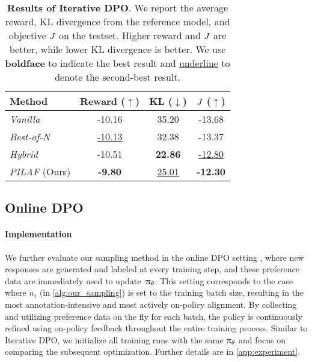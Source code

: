 \begin{table}
\vspace{-5pt}
    \caption{\textbf{Results of Iterative DPO}. We report the average reward, KL divergence from the reference model, and objective $J$ on the testset. Higher reward and $J$ are better, while lower KL divergence is better. We use \textbf{boldface} to indicate the best result and \underline{underline} to denote the second-best result.}
    \label{tab:iterative_DPO}
    \vskip 0.2in
    \centering
\begin{small}
\begin{sc}
    \begin{tabular}{l|ccc}
    \toprule
        \textbf{Method} & Reward ($\uparrow$) & KL ($\downarrow$) & $J$ ($\uparrow$)\\ 
        \midrule
        \textit{Vanilla} & -10.16 & 35.20 & -13.68 \\
        \textit{Best-of-N} & \underline{-10.13} & 32.38 & -13.37\\
        \textit{Hybrid} & -10.51 & \textbf{22.86} & \underline{-12.80} \\
        \midrule
        \textit{PILAF} (Ours) & \textbf{-9.80} & \underline{25.01} & \textbf{-12.30} \\
    \bottomrule
    \end{tabular}
\end{sc}
\end{small}
\vspace{-.5em}
\end{table}

\subsection{Online DPO}\label{subsec:online_dpo}

\paragraph{Implementation} We further evaluate our sampling method in the online DPO setting \citep{guo2024direct}, where new responses are generated and labeled at every training step, and these preference data are immediately used to update~$\uppi_{\theta}$. This setting corresponds to the case where $n_t$ (in \cref{alg:our_sampling}) is set to the training batch size, resulting in the most annotation-intensive and most actively on-policy alignment.
By collecting and utilizing preference data on the fly for each batch, the policy is continuously refined using on-policy feedback throughout the entire training process. Similar to Iterative DPO, we initialize all training runs with the same $\uppi_{\theta}$ and focus on comparing the subsequent optimization. Further details are in \cref{app:experiment}.

